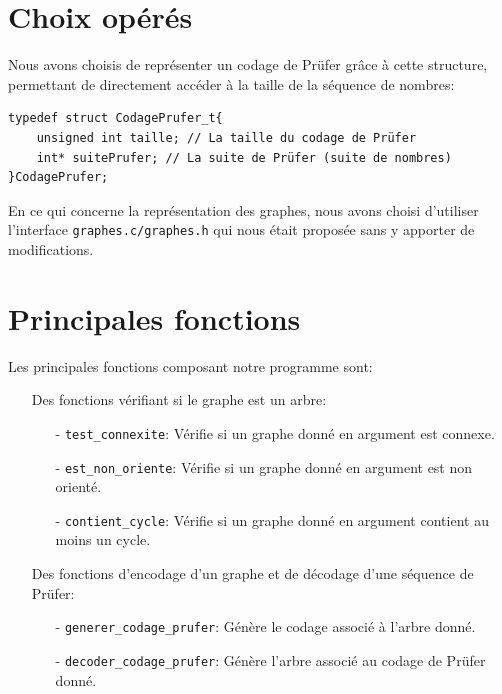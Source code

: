 \documentclass[a4paper, 11pt, oneside]{article}
\begin{document}
\section{Choix opérés}

Nous avons choisis de représenter un codage de Prüfer grâce à cette structure, permettant de directement accéder à la taille de la séquence de nombres: 

\begin{lstlisting}
typedef struct CodagePrufer_t{
	unsigned int taille; // La taille du codage de Prüfer
	int* suitePrufer; // La suite de Prüfer (suite de nombres)
}CodagePrufer;
\end{lstlisting}

En ce qui concerne la représentation des graphes, nous avons choisi d'utiliser l'interface \texttt{graphes.c/graphes.h} qui nous était proposée sans y apporter de modifications.

\section{Principales fonctions}

Les principales fonctions composant notre programme sont:\\

\begin{itemize}

\item[\textbullet] Des fonctions vérifiant si le graphe est un arbre:\\

\begin{itemize}

	\item[-] \texttt{test\_connexite}: Vérifie si un graphe donné en argument est connexe.
	
	\item[-] \texttt{est\_non\_oriente}: Vérifie si un graphe donné en argument est non orienté.

	\item[-] \texttt{contient\_cycle}: Vérifie si un graphe donné en argument contient au moins un cycle.\\

\end{itemize}

\item[\textbullet] Des fonctions d'encodage d'un graphe et de décodage d'une séquence de Prüfer:\\

\begin{itemize}

	\item[-] \texttt{generer\_codage\_prufer}: Génère le codage associé à l'arbre donné.
	
	\item[-] \texttt{decoder\_codage\_prufer}: Génère l'arbre associé au codage de Prüfer donné.

\end{itemize}

\end{itemize}
\end{document}
